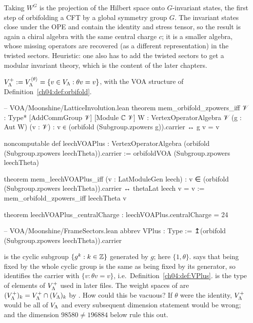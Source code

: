 \begin{physics}
Taking $W^G$ is the projection of the Hilbert space onto $G$-invariant states, the first step of orbifolding a CFT by a global symmetry group $G$. The invariant states close under the OPE and contain the identity and stress tensor, so the result is again a chiral algebra with the same central charge $c$; it is a smaller algebra, whose missing operators are recovered (as a different representation) in the twisted sectors. Heuristic: one also has to add the twisted sectors to get a modular invariant theory, which is the content of the later chapters.
\end{physics}

\begin{definition}[$V_\Leech^+$]\label{ch04:def:VPlus}
$V_{\Lambda}^+:=V_{\Lambda}^{\langle\theta\rangle}=\{v\in V_{\Lambda}:\theta v=v\}$, with the VOA structure of
Definition~\ref{ch04:def:orbifold}.
\end{definition}

\begin{leancode}
-- VOA/Moonshine/LatticeInvolution.lean
theorem mem_orbifold_zpowers_iff {𝒱 : Type*} [AddCommGroup 𝒱] [Module ℂ 𝒱]
    {W : VertexOperatorAlgebra 𝒱} (g : Aut W) (v : 𝒱) :
    v ∈ (orbifold (Subgroup.zpowers g)).carrier ↔ g v = v

noncomputable def leechVOAPlus :
    VertexOperatorAlgebra (orbifold (Subgroup.zpowers leechTheta)).carrier :=
  orbifoldVOA (Subgroup.zpowers leechTheta)

theorem mem_leechVOAPlus_iff (v : LatModuleGen leech) :
    v ∈ (orbifold (Subgroup.zpowers leechTheta)).carrier ↔ thetaLat leech v = v :=
  mem_orbifold_zpowers_iff leechTheta v

theorem leechVOAPlus_centralCharge : leechVOAPlus.centralCharge = 24

-- VOA/Moonshine/FrameSectors.lean
abbrev VPlus : Type := ↥(orbifold (Subgroup.zpowers leechTheta)).carrier
\end{leancode}

\begin{dictionary}
 is the cyclic subgroup $\{g^k:k\in{\mathbb{Z}}\}$ generated by $g$; here
$\{1,\theta\}$.  says that being fixed by the whole cyclic group is
the same as being fixed by its generator, so  identifies the carrier
with $\{v:\theta v=v\}$, i.e.\ Definition~\ref{ch04:def:VPlus}.  is the type of
elements of $V_\Leech^+$ used in later files. The weight spaces of  are
$(V_{\Lambda}^+)_k=V_{\Lambda}^+\cap(V_{\Lambda})_k$ by . How could this be vacuous? If $\theta$
were the identity, $V_\Leech^+$ would be all of $V_{\Lambda}$ and every subsequent dimension statement
would be wrong;  and the dimension $98580\neq196884$ below rule this out.
\end{dictionary}

